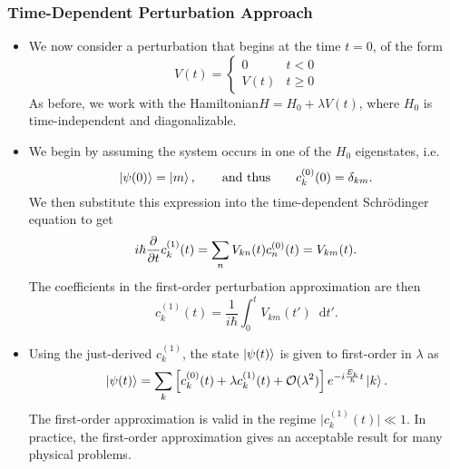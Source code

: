 \documentclass[11pt, a4paper]{article}
\newcommand{\diff}{\mathop{}\!\mathrm{d}} %
\newcommand{\Schro}{Schr\"{o}dinger\xspace}
\newcommand{\Ham}{Hamiltonian\xspace}
\begin{document}
\subsubsection{Time-Dependent Perturbation Approach}
\begin{itemize}
    \item We now consider a perturbation that begins at the time $ t = 0 $, of the form
    \begin{equation*}
        V(t) = 
        \begin{cases}
            0 & t < 0\\
            V(t) & t \geq 0
        \end{cases}
    \end{equation*}
    As before, we work with the \Ham $  H = H_{0} + \lambda V(t) $, where $ H_{0} $ is time-independent and diagonalizable. 

    \item We begin by assuming the system occurs in one of the $ H_{0} $ eigenstates, i.e. 
    \begin{equation*}
        \ket{\psi(0)} = \ket{m}, \qquad \text{and thus} \qquad  c_{k}^{(0)}(0) = \delta_{km}.
    \end{equation*}
    We then substitute this expression into the time-dependent \Schro equation to get
    \begin{equation*}
        i \hbar \pdv{t}c_{k}^{(1)}(t) = \sum_{n} V_{kn}(t)c_{n}^{(0)}(t) = V_{km}(t).
    \end{equation*}
    The coefficients in the first-order perturbation approximation are then 
    \begin{equation*}
        c_{k}^{(1)}(t) = \frac{1}{i \hbar} \int_{0}^{t}V_{km}(t')\diff t'.
    \end{equation*}
    
    \item Using the just-derived $ c_{k}^{(1)} $, the state $ \ket{\psi(t)} $ is given to first-order in $ \lambda $ as
    \begin{equation*}
        \ket{\psi(t)} = \sum_{k}\left[ c_{k}^{(0)}(t) + \lambda c_{k}^{(1)}(t) + \mathcal{O}(\lambda^{2})\right]e^{-i \frac{E_{k}}{\hbar}t}\ket{k}.
    \end{equation*}
    The first-order approximation is valid in the regime $ \big| c_{k}^{(1)}(t) \big| \ll 1 $. In practice, the first-order approximation gives an acceptable result for many physical problems.
    
    
\end{itemize}
\end{document}
